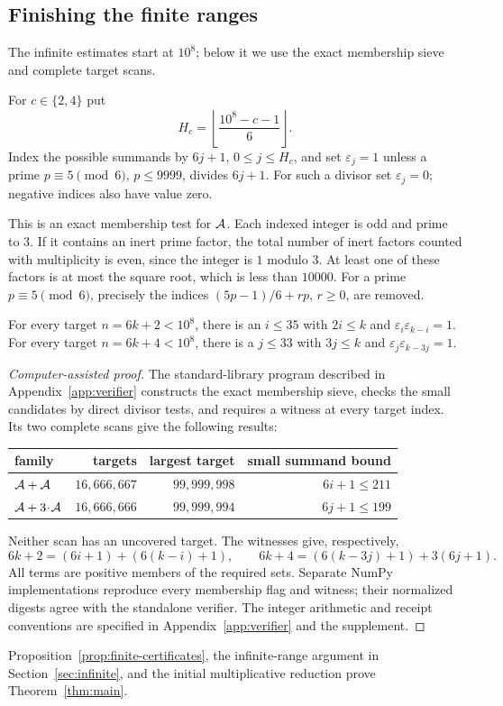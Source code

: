 \subsection{Finishing the finite ranges}\label{sec:finite}
The infinite estimates start at \(10^8\); below it we use the exact
membership sieve and complete target scans.

For $c\in\{2,4\}$ put
\[
H_c=\left\lfloor\frac{10^8-c-1}{6}\right\rfloor.
\]
Index the possible summands by $6j+1$, $0\le j\le H_c$, and set
$\varepsilon_j=1$ unless a prime $p\equiv5\pmod6$, $p\le9999$, divides
$6j+1$. For such a divisor set $\varepsilon_j=0$; negative indices also
have value zero.

This is an exact membership test for $\AA$. Each indexed integer is odd
and prime to $3$. If it contains an inert prime factor, the total number
of inert factors counted with multiplicity is even, since the integer is
$1$ modulo $3$. At least one of these factors is at most the square root,
which is less than $10000$. For a prime $p\equiv5\pmod6$, precisely the
indices $(5p-1)/6+rp$, $r\ge0$, are removed.

\begin{proposition}\label{prop:finite-certificates}
For every target $n=6k+2<10^8$, there is an $i\le35$ with
$2i\le k$ and $\varepsilon_i\varepsilon_{k-i}=1$. For every target
$n=6k+4<10^8$, there is a $j\le33$ with $3j\le k$ and
$\varepsilon_j\varepsilon_{k-3j}=1$.
\end{proposition}
\begin{proof}[Computer-assisted proof]
The standard-library program described in Appendix~\ref{app:verifier}
constructs the exact membership sieve, checks the small candidates by
direct divisor tests, and requires a witness at every target index.
Its two complete scans give the following results:
\begin{center}
\begin{tabular}{lrrr}
\toprule
family & targets & largest target & small summand bound\\\midrule
$\AA+\AA$ & $16{,}666{,}667$ & $99{,}999{,}998$ & $6i+1\le211$\\
$\AA+3\!\cdot\!\AA$ & $16{,}666{,}666$ & $99{,}999{,}994$ & $6j+1\le199$\\
\bottomrule
\end{tabular}
\end{center}
Neither scan has an uncovered target. The witnesses give, respectively,
\[
6k+2=(6i+1)+(6(k-i)+1),\qquad
6k+4=(6(k-3j)+1)+3(6j+1).
\]
All terms are positive members of the required sets. Separate NumPy
implementations reproduce every membership flag and witness; their
normalized digests agree with the standalone verifier. The integer
arithmetic and receipt conventions are specified in
Appendix~\ref{app:verifier} and the supplement.
\end{proof}
Proposition~\ref{prop:finite-certificates}, the infinite-range argument in
Section~\ref{sec:infinite}, and the initial multiplicative reduction prove
Theorem~\ref{thm:main}.

